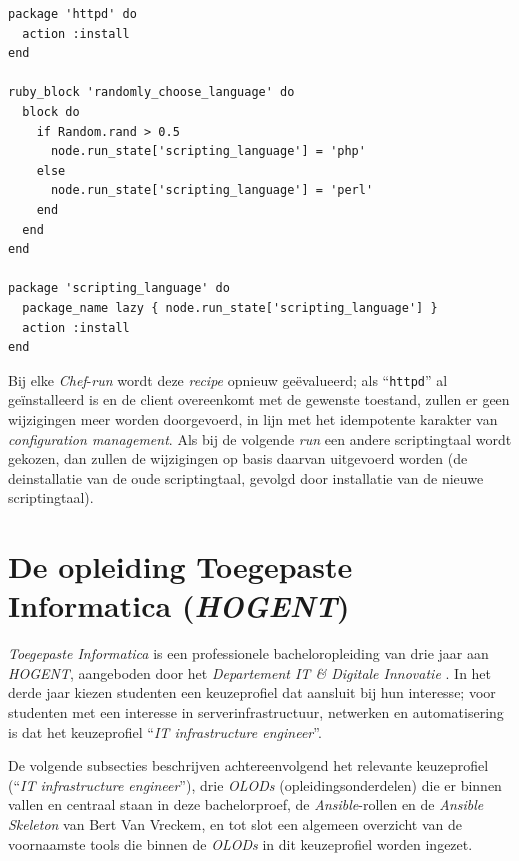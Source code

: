 \begin{codeblock}
  \begin{verbatim}
package 'httpd' do
  action :install
end

ruby_block 'randomly_choose_language' do
  block do
    if Random.rand > 0.5
      node.run_state['scripting_language'] = 'php'
    else
      node.run_state['scripting_language'] = 'perl'
    end
  end
end

package 'scripting_language' do
  package_name lazy { node.run_state['scripting_language'] }
  action :install
end
\end{verbatim}
  \caption[Eenvoudige \emph{Chef}-\emph{recipe} voor een webserver]{\autocite{ProgressSoftware2025}}
  \label{code:chefvb}
\end{codeblock}

Bij elke \emph{Chef}-\emph{run} wordt deze \emph{recipe} opnieuw geëvalueerd; als ``\texttt{httpd}'' al geïnstalleerd is en de client overeenkomt met de gewenste toestand, zullen er geen wijzigingen meer worden doorgevoerd, in lijn met het idempotente karakter van \emph{configuration management}. Als bij de volgende \emph{run} een andere scriptingtaal wordt gekozen, dan zullen de wijzigingen op basis daarvan uitgevoerd worden (de deinstallatie van de oude scriptingtaal, gevolgd door installatie van de nieuwe scriptingtaal).

\section{De opleiding Toegepaste Informatica (\emph{HOGENT})}%
\label{sec:opleiding}

\emph{Toegepaste Informatica} is een professionele bacheloropleiding van drie jaar aan \emph{HOGENT}, aangeboden door het \emph{Departement IT \& Digitale Innovatie} \autocite{HOGENT2024}. In het derde jaar kiezen studenten een keuzeprofiel dat aansluit bij hun interesse; voor studenten met een interesse in serverinfrastructuur, netwerken en automatisering is dat het keuzeprofiel ``\emph{IT infrastructure engineer}''.

De volgende subsecties beschrijven achtereenvolgend het relevante keuzeprofiel (``\emph{IT infrastructure engineer}''), drie \emph{OLODs} (opleidingsonderdelen) die er binnen vallen en centraal staan in deze bachelorproef, de \emph{Ansible}-rollen en de \emph{Ansible Skeleton} van Bert Van Vreckem, en tot slot een algemeen overzicht van de voornaamste tools die binnen de \emph{OLODs} in dit keuzeprofiel worden ingezet.

